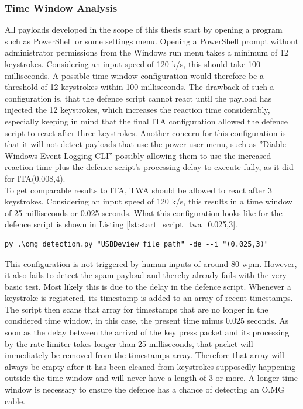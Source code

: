 \subsubsection{Time Window Analysis}


All payloads developed in the scope of this thesis start by opening a program such as PowerShell or some settings menu. Opening a PowerShell prompt without administrator permissions from the Windows run menu takes a minimum of 12 keystrokes. Considering an input speed of 120 k/s, this should take 100 milliseconds. A possible time window configuration would therefore be a threshold of 12 keystrokes within 100 milliseconds. The drawback of such a configuration is, that the defence script cannot react until the payload has injected the 12 keystrokes, which increases the reaction time considerably, especially keeping in mind that the final ITA configuration allowed the defence script to react after three keystrokes. Another concern for this configuration is that it will not detect payloads that use the power user menu, such as ''Diable Windows Event Logging CLI'' possibly allowing them to use the increased reaction time plus the defence script's processing delay to execute fully, as it did for ITA(0.008,4). \\
To get comparable results to ITA, TWA should be allowed to react after 3 keystrokes. Considering an input speed of 120 k/s, this results in a time window of 25 milliseconds or 0.025 seconds. What this configuration looks like for the defence script is shown in Listing \ref{lst:start_script_twa_0.025,3}.

\begin{lstlisting}[caption={start defence Script with TWA (0.025,3)},label={lst:start_script_twa_0.025,3}, captionpos=b]
 py .\omg_detection.py "USBDeview file path" -de --i "(0.025,3)"
\end{lstlisting}



This configuration is not triggered by human inputs of around 80 wpm. However, it also fails to detect the spam payload and thereby already fails with the very basic test. Most likely this is due to the delay in the defence script. Whenever a keystroke is registered, its timestamp is added to an array of recent timestamps. The script then scans that array for timestamps that are no longer in the considered time window, in this case, the present time minus 0.025 seconds. As soon as the delay between the arrival of the key press packet and its processing by the rate limiter takes longer than 25 milliseconds, that packet will immediately be removed from the timestamps array. Therefore that array will always be empty after it has been cleaned from keystrokes supposedly happening outside the time window and will never have a length of 3 or more. A longer time window is necessary to ensure the defence has a chance of detecting an O.MG cable.

